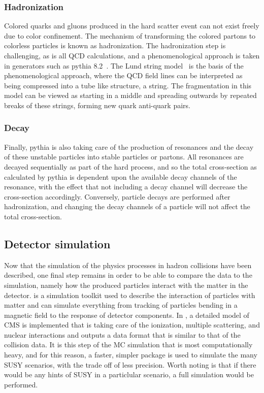 \subsubsection*{Hadronization}
\noindent
\justify
Colored quarks and gluons produced in the hard scatter event can not exist freely due to color confinement. 
The mechanism of transforming the colored partons to colorless particles is known as hadronization. 
The hadronization step is challenging, as is all QCD calculations, and a phenomenological approach is taken in generators such as {\sc pythia} 8.2~\cite{Sjostrand:2014zea}.
The Lund string model~\cite{Andersson:1983ia} is the basis of the phenomenological approach, where the QCD field lines can be interpreted as being compressed into a tube like structure, a string. 
The fragmentation in this model can be viewed as starting in a middle and spreading outwards by repeated breaks of these strings, forming new quark anti-quark pairs. 
\subsubsection*{Decay}
\noindent
\justify
Finally, {\sc pythia} is also taking care of the production of resonances and the decay of these unstable particles into stable particles or partons.  
All resonances are decayed sequentially as part of the hard process, and so the total cross-section as calculated by {\sc pythia} is dependent upon the available decay channels of the resonance, with the effect that not including a decay channel will decrease the cross-section accordingly. 
Conversely, particle decays are performed after hadronization, and changing the decay channels of a particle will not affect the total cross-section.  
\subsection*{Detector simulation}
\noindent
\justify
Now that the simulation of the physics processes in hadron collisions have been described, one final step remains in order to be able to compare the data to the simulation, namely how the produced particles interact with the matter in the detector. 
\GEANTfour is a simulation toolkit used to describe the interaction of particles with matter and can simulate everything from tracking of particles bending in a magnetic field to the response of detector components. 
In \GEANTfour, a detailed model of CMS is implemented that is taking care of the ionization, multiple scattering, and nuclear interactions and outputs a data format that is similar to that of the collision data. 
It is this step of the MC simulation that is most computationally heavy, and for this reason, a faster, simpler package is used to simulate the many SUSY scenarios, with the trade off of less precision. 
Worth noting is that if there would be any hints of SUSY in a particlular scenario, a full simulation would be performed.
